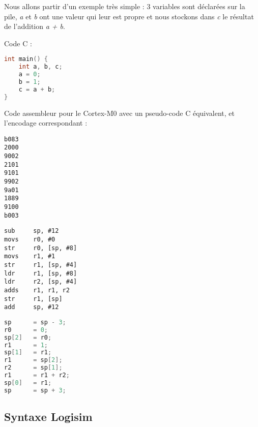 \documentclass{article}
\begin{document}
    Nous allons partir d'un exemple très simple : 3 variables sont déclarées sur la pile, \textit{a} et \textit{b} ont une valeur qui leur est propre et nous stockons dans \textit{c} le résultat de l'addition \textit{a + b}.
    \newline
    \begin{minipage}{\linewidth}
        Code C :
        \begin{lstlisting}[language=C]
int main() {
	int a, b, c;
	a = 0;
	b = 1;
	c = a + b;
}
        \end{lstlisting}
    \end{minipage}
    Code assembleur pour le Cortex-M0 avec un pseudo-code C équivalent, et l'encodage correspondant :\\
    \begin{minipage}{\linewidth}
        \begin{minipage}{1cm}
            \begin{lstlisting}[xleftmargin=0pt]
b083
2000
9002
2101
9101
9902
9a01
1889
9100
b003
            \end{lstlisting}
        \end{minipage}\quad
        \begin{minipage}{.39\textwidth}
            \begin{lstlisting}[language={[ARM]{Assembler}},xleftmargin=0pt]
sub     sp, #12
movs    r0, #0
str     r0, [sp, #8]
movs    r1, #1
str     r1, [sp, #4]
ldr     r1, [sp, #8]
ldr     r2, [sp, #4]
adds    r1, r1, r2
str     r1, [sp]
add     sp, #12
        \end{lstlisting}
    \end{minipage} \quad
    \begin{minipage}{.49\textwidth}
        \begin{lstlisting}[language=C,xleftmargin=0pt]
sp 		= sp - 3;
r0 		= 0;
sp[2] 	= r0;
r1 		= 1;
sp[1] 	= r1;
r1 		= sp[2];
r2 		= sp[1];
r1 		= r1 + r2;
sp[0] 	= r1;
sp 		= sp + 3;
        \end{lstlisting}
    \end{minipage}
\end{minipage}

\subsection{Syntaxe Logisim}
\end{document}
